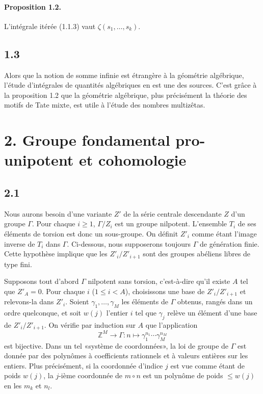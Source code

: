 \documentclass[10pt]{article}
\newcommand{\Z}{\mathbb Z}
\begin{document}
\paragraph{Proposition 1.2.}
L'intégrale itérée (1.1.3) vaut $\zeta(s_1,\ldots,s_k)$.

\subsection*{1.3}
Alors que la notion de somme infinie est étrangère à la géométrie algébrique, l'étude d'intégrales de quantités algébriques en est une des sources. C'est grâce à la proposition 1.2 que la géométrie algébrique, plus précisément la théorie des motifs de Tate mixte, est utile à l'étude des nombres multizêtas.

\section*{2. Groupe fondamental pro-unipotent et cohomologie}
\subsection*{2.1}
Nous aurons besoin d'une variante $Z'$ de la série centrale descendante $Z$ d'un groupe $\Gamma$. Pour chaque $i\geq1$, $\Gamma/Z_i$ est un groupe nilpotent. L'ensemble $T_i$ de ses éléments de torsion est donc un sous-groupe. On définit $Z'_i$ comme étant l'image inverse de $T_i$ dans $\Gamma$. Ci-dessous, nous supposerons toujours $\Gamma$ de génération finie. Cette hypothèse implique que les $Z'_i/Z'_{i+1}$ sont des groupes abéliens libres de type fini.

Supposons tout d'abord $\Gamma$ nilpotent sans torsion, c'est-à-dire qu'il existe $A$ tel que $Z'_A=0$. Pour chaque $i$ ($1\leq i<A$), choisissons une base de $Z'_i/Z'_{i+1}$ et relevons-la dans $Z'_i$. Soient $\gamma_1,\ldots,\gamma_M$ les éléments de $\Gamma$ obtenus, rangés dans un ordre quelconque, et soit $w(j)$ l'entier $i$ tel que $\gamma_j$ relève un élément d'une base de $Z'_i/Z'_{i+1}$. On vérifie par induction sur $A$ que l'application
\[
 \Z^M\longrightarrow \Gamma: n\longmapsto \gamma_1^{n_1}\cdots\gamma_M^{n_M}
\]
est bijective. Dans un tel «système de coordonnées», la loi de groupe de $\Gamma$ est donnée par des polynômes à coefficients rationnels et à valeurs entières sur les entiers. Plus précisément, si la coordonnée d'indice $j$ est vue comme étant de poids $w(j)$, la $j$-ième coordonnée de $m\circ n$ est un polynôme de poids $\leq w(j)$ en les $m_k$ et $n_l$.
\end{document}

